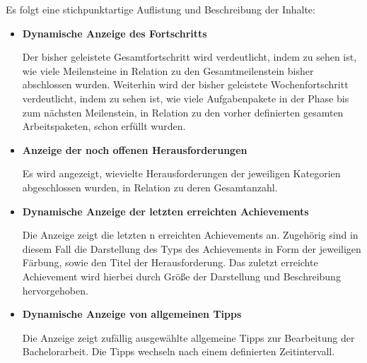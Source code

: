 \documentclass[bibliography=totoc,listof=totoc,BCOR=5mm,DIV=12,oneside]{scrbook}
\begin{document}
\par \medskip Es folgt eine stichpunktartige Auflistung und Beschreibung der Inhalte:
\begin{itemize}
\item \textbf{Dynamische Anzeige des Fortschritts}
\par Der bisher geleistete Gesamtfortschritt wird verdeutlicht, indem zu sehen ist, wie viele Meilensteine in Relation zu den Gesamtmeilenstein bisher abschlossen wurden. Weiterhin wird der bisher geleistete Wochenfortschritt verdeutlicht, indem zu sehen ist, wie viele Aufgabenpakete in der Phase bis zum nächsten Meilenstein, in Relation zu den vorher definierten gesamten Arbeitspaketen, schon erfüllt wurden.
\item \textbf{Anzeige der noch offenen Herausforderungen}
\par Es wird angezeigt, wievielte Herausforderungen der jeweiligen Kategorien abgeschlossen wurden, in Relation zu deren Gesamtanzahl.
\item \textbf{Dynamische Anzeige der letzten erreichten Achievements}
\par Die Anzeige zeigt die letzten n erreichten Achievements an. Zugehörig sind in diesem Fall die Darstellung des Typs des Achievements in Form der jeweiligen Färbung, sowie den Titel der Herausforderung. Das zuletzt erreichte Achievement wird hierbei durch Größe der Darstellung und Beschreibung hervorgehoben.
\item \textbf{Dynamische Anzeige von allgemeinen Tipps}
\par Die Anzeige zeigt zufällig ausgewählte allgemeine Tipps zur Bearbeitung der Bachelorarbeit. Die Tipps wechseln nach einem definierten Zeitintervall.
\end{itemize}
\end{document}
